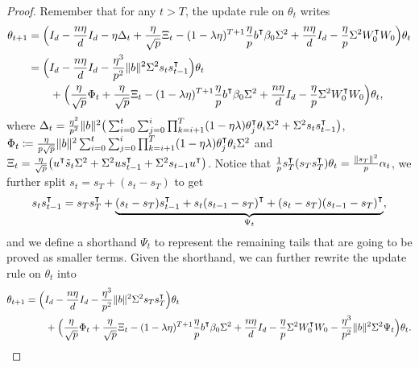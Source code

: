 \begin{proof}
    Remember that for any $t>T$, the update rule on $\theta_t$ writes
    \begin{align*}
        \theta_{t+1} & = \Big( I_d - \frac{n\eta}{d} I_d - \eta\Delta_t + \frac{\eta}{\sqrt p}\Xi_t  - (1-\lambda\eta)^{T+1} \frac{\eta}{p} b\transpose\beta_0 \Sigma^2 + \frac{n\eta}{d}I_d - \frac{\eta}{p}\Sigma^2 W_0\transpose W_0 \Big)\theta_t \\
        & = \Big( I_d - \frac{n\eta}{d} I_d - \frac{\eta^3}{p^2} \|b\|^2 \Sigma^2 s_t s_{t-1}\transpose \Big)\theta_t \\
        & \qquad + \Big( \frac{\eta}{\sqrt{p}} \Phi_t + \frac{\eta}{\sqrt p}\Xi_t  - (1-\lambda\eta)^{T+1} \frac{\eta}{p} b\transpose\beta_0 \Sigma^2 + \frac{n\eta}{d}I_d - \frac{\eta}{p}\Sigma^2 W_0\transpose W_0 \Big)\theta_t,
    \end{align*}
    where $\Delta_t = \frac{\eta^2}{p^2} \|b\|^2\big(\sum_{i=0}^t\sum_{j=0}^i \prod_{k=i+1}^T (1-\eta\lambda)\theta_j\transpose \theta_i \Sigma^2 + \Sigma^2 s_t s_{t-1}\transpose \big)$, $\Phi_t \defeq \frac{\eta}{p\sqrt{p}} \|b\|^2 \sum_{i=0}^t\sum_{j=0}^i \prod_{k=i+1}^T (1-\eta\lambda)\theta_j\transpose \theta_i \Sigma^2$ and $\Xi_t = \frac{\eta}{\sqrt p}\big(u\transpose \tilde{s}_t \Sigma^2 + \Sigma^2 u s_{t-1}\transpose + \Sigma^2 s_{t-1}u\transpose\big)$. Notice that $\frac{1}{p} s_T\transpose(s_T s_T\transpose)\theta_t = \frac{\|s_T\|^2}{p} \alpha_t$, we further split $s_t = s_T + (s_t - s_T)$ to get
    \begin{align*}
        s_t s_{t-1}\transpose = s_T s_T\transpose + \underbrace{(s_t - s_T) s_{t-1}\transpose + s_t (s_{t-1} - s_T)\transpose + (s_t - s_T)(s_{t-1} - s_T)\transpose}_{\Psi_t},
    \end{align*}
    and we define a shorthand $\Psi_t$ to represent the remaining tails that are going to be proved as smaller terms. Given the shorthand, we can further rewrite the update rule on $\theta_t$ into
    \begin{align}
        \begin{split}\label{eqn:update-split}
            \theta_{t+1} & = \Big( I_d - \frac{n\eta}{d} I_d - \frac{\eta^3}{p^2} \|b\|^2 \Sigma^2 s_T s_T\transpose \Big)\theta_t \\
            & \qquad + \Big( \frac{\eta}{\sqrt{p}} \Phi_t + \frac{\eta}{\sqrt p}\Xi_t  - (1-\lambda\eta)^{T+1} \frac{\eta}{p} b\transpose\beta_0 \Sigma^2 + \frac{n\eta}{d}I_d - \frac{\eta}{p}\Sigma^2 W_0\transpose W_0 - \frac{\eta^3}{p^2} \|b\|^2 \Sigma^2 \Psi_t \Big)\theta_t.
        \end{split}

\end{align}
\end{proof}
